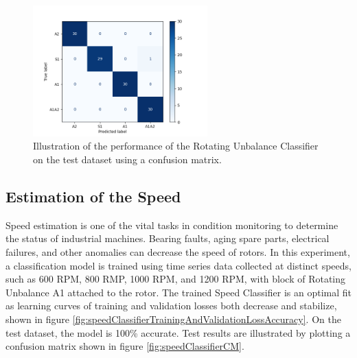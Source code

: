 \documentclass[
  manuscript=report,  %
  layout=preprint,  %
  year=20xx,
  volume=x,
]{extra/joas}
\begin{document}
\begin{figure}[ht!]
  \centering
  \includegraphics[width=0.6\textwidth]{figures/confusionMatrix.png}
  \caption{Illustration of the performance of the Rotating Unbalance Classifier on the test dataset using a confusion matrix.}
  \label{fig:rotatingUnbalanceCM}
\end{figure}


\subsection{Estimation of the Speed}

Speed estimation is one of the vital tasks in condition monitoring to determine the status of industrial machines. Bearing faults, aging spare parts, electrical failures, and other anomalies can decrease the speed of rotors. In this experiment, a classification model is trained using time series data collected at distinct speeds, such as 600 RPM, 800 RMP, 1000 RPM, and 1200 RPM, with block of Rotating Unbalance A1 attached to the rotor. The trained Speed Classifier is an optimal fit as learning curves of training and validation losses both decrease and stabilize, shown in figure \ref{fig:speedClassifierTrainingAndValidationLossAccuracy}. On the test dataset, the model is 100\% accurate. Test results are illustrated by plotting a confusion matrix shown in figure  \ref{fig:speedClassifierCM}.
\end{document}
